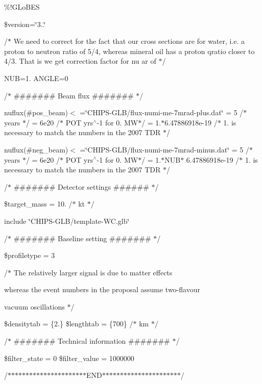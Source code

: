 \%!\+G\+Lo\+B\+ES

\$version=\char`\"{}3..\char`\"{}

/$\ast$ We need to correct for the fact that our cross sections are for water, i.\+e. a proton to neutron ratio of 5/4, whereas mineral oil has a proton qratio closer to 4/3. That is we get correction factor for nu ar of $\ast$/

N\+UB=1. A\+N\+G\+LE=0

/$\ast$ \#\#\#\#\#\#\# Beam flux \#\#\#\#\#\#\# $\ast$/

nuflux(\#pos\+\_\+beam)$<$ =\char`\"{}\+C\+H\+I\+P\+S-\/\+G\+L\+B/flux-\/numi-\/me-\/7mrad-\/plus.\+dat\char`\"{}  = 5 /$\ast$ years $\ast$/  = 6e20 /$\ast$ P\+OT yrs$^\wedge$-\/1 for 0. M\+W$\ast$/  = 1.$\ast$6.47886918e-\/19 /$\ast$ 1. is necessary to match the numbers in the 2007 T\+DR $\ast$/ \begin{quote}


\end{quote}


nuflux(\#neg\+\_\+beam)$<$ =\char`\"{}\+C\+H\+I\+P\+S-\/\+G\+L\+B/flux-\/numi-\/me-\/7mrad-\/minus.\+dat\char`\"{}  = 5 /$\ast$ years $\ast$/  = 6e20 /$\ast$ P\+OT yrs$^\wedge$-\/1 for 0. M\+W$\ast$/  = 1.$\ast$\+N\+U\+B$\ast$ 6.\+47886918e-\/19 /$\ast$ 1. is necessary to match the numbers in the 2007 T\+DR $\ast$/ \begin{quote}


\end{quote}


/$\ast$ \#\#\#\#\#\#\# Detector settings \#\#\#\#\#\# $\ast$/

\$target\+\_\+mass = 10. /$\ast$ kt $\ast$/

include \char`\"{}\+C\+H\+I\+P\+S-\/\+G\+L\+B/template-\/\+W\+C.\+glb\char`\"{}

/$\ast$ \#\#\#\#\#\#\# Baseline setting \#\#\#\#\#\#\# $\ast$/

\$profiletype = 3

/$\ast$ The relatively larger signal is due to matter effects
\begin{DoxyItemize}
\item whereas the event numbers in the proposal assume two-\/flavour
\item vacuum oscillations $\ast$/
\end{DoxyItemize}

\$densitytab = \{2.\} \$lengthtab = \{700\} /$\ast$ km $\ast$/

/$\ast$ \#\#\#\#\#\#\# Technical information \#\#\#\#\#\#\# $\ast$/

\$filter\+\_\+state = 0 \$filter\+\_\+value = 1000000

/$\ast$$\ast$$\ast$$\ast$$\ast$$\ast$$\ast$$\ast$$\ast$$\ast$$\ast$$\ast$$\ast$$\ast$$\ast$$\ast$$\ast$$\ast$$\ast$$\ast$$\ast$$\ast$\+E\+N\+D$\ast$$\ast$$\ast$$\ast$$\ast$$\ast$$\ast$$\ast$$\ast$$\ast$$\ast$$\ast$$\ast$$\ast$$\ast$$\ast$$\ast$$\ast$$\ast$$\ast$$\ast$$\ast$/ 